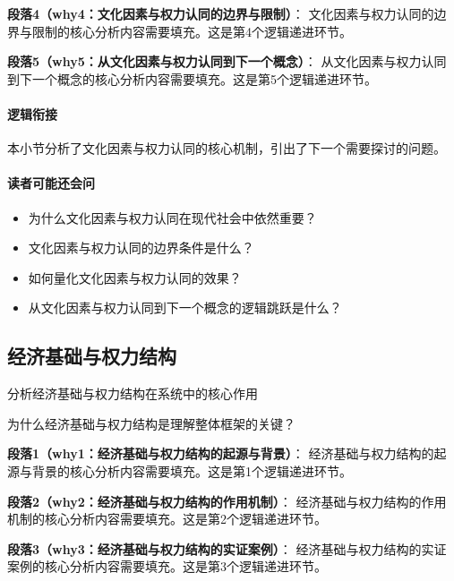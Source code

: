\documentclass[../main.tex]{subfiles}
\begin{document}
\textbf{段落4（why4：文化因素与权力认同的边界与限制）}：
文化因素与权力认同的边界与限制的核心分析内容需要填充。这是第4个逻辑递进环节。


\textbf{段落5（why5：从文化因素与权力认同到下一个概念）}：
从文化因素与权力认同到下一个概念的核心分析内容需要填充。这是第5个逻辑递进环节。


\paragraph*{逻辑衔接}
本小节分析了文化因素与权力认同的核心机制，引出了下一个需要探讨的问题。

\paragraph*{读者可能还会问}
\begin{itemize}
\item 为什么文化因素与权力认同在现代社会中依然重要？
\item 文化因素与权力认同的边界条件是什么？
\item 如何量化文化因素与权力认同的效果？
\item 从文化因素与权力认同到下一个概念的逻辑跳跃是什么？
\end{itemize}


\subsection{经济基础与权力结构}

\begin{motivation}
分析经济基础与权力结构在系统中的核心作用
\end{motivation}

\begin{logicmap}
[逻辑链占位]
\end{logicmap}

\begin{questionbox}
为什么经济基础与权力结构是理解整体框架的关键？
\end{questionbox}

\textbf{段落1（why1：经济基础与权力结构的起源与背景）}：
经济基础与权力结构的起源与背景的核心分析内容需要填充。这是第1个逻辑递进环节。


\textbf{段落2（why2：经济基础与权力结构的作用机制）}：
经济基础与权力结构的作用机制的核心分析内容需要填充。这是第2个逻辑递进环节。


\textbf{段落3（why3：经济基础与权力结构的实证案例）}：
经济基础与权力结构的实证案例的核心分析内容需要填充。这是第3个逻辑递进环节。
\end{document}
